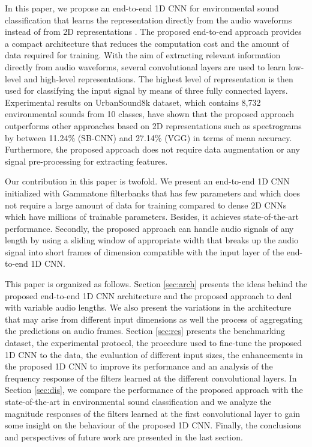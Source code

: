 \documentclass[preprint,final,12pt]{elsarticle}
\begin{document}
In this paper, we propose an end-to-end 1D CNN for environmental sound classification that learns the representation directly from the audio waveforms instead of from 2D representations \citep{piczak2015environmental,2017deepsalamon,salamon2015unsupervised}. The proposed end-to-end approach provides a compact architecture that reduces the computation cost and the amount of data required for training. With the aim of extracting relevant information directly from audio waveforms, several convolutional layers are used to learn low-level and high-level representations. The highest level of representation is then used for classifying the input signal by means of three fully connected layers. Experimental results on UrbanSound8k dataset, which contains 8,732 environmental sounds from 10 classes, have shown that the proposed approach outperforms other approaches based on 2D representations such as spectrograms \citep{piczak2015environmental,2017deepsalamon,pons2018randomly,salamon2015unsupervised} by between 11.24\% (SB-CNN) and 27.14\% (VGG) in terms of mean accuracy. Furthermore, the proposed approach does not require data augmentation or any signal pre-processing for extracting features.

Our contribution in this paper is twofold. We present an end-to-end 1D CNN initialized with Gammatone filterbanks that has few parameters and which does not require a large amount of data for training compared to dense 2D CNNs which have millions of trainable parameters. Besides, it achieves state-of-the-art performance. Secondly, the proposed approach can handle audio signals of any length by using a sliding window of appropriate width that breaks up the audio signal into short frames of dimension compatible with the input layer of the end-to-end 1D CNN. 

This paper is organized as follows. Section \ref{sec:arch} presents the ideas behind the proposed end-to-end 1D CNN architecture and the proposed approach to deal with variable audio lengths. We also present the variations in the architecture that may arise from different input dimensions as well the process of aggregating the predictions on audio frames. Section \ref{sec:res} presents the benchmarking dataset, the experimental protocol, the procedure used to fine-tune the proposed 1D CNN to the data, the evaluation of different input sizes, the enhancements in the proposed 1D CNN to improve its performance and an analysis of the frequency response of the filters learned at the different convolutional layers. In Section \ref{sec:dis}, we compare the performance of the proposed approach with the state-of-the-art in environmental sound classification and we analyze the magnitude responses of the filters learned at the first convolutional layer to gain some insight on the behaviour of the proposed 1D CNN. Finally, the conclusions and perspectives of future work are presented in the last section. 
\end{document}
